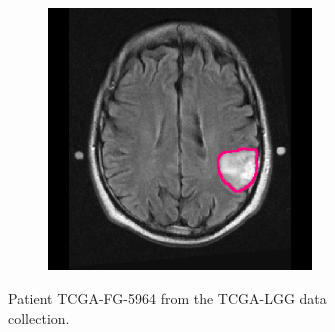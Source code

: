 \begin{subappendices}
\begin{figure}[htbp]
\begin{subfigure}[b]{0.95\textwidth}
\begin{subfigure}[b]{0.215\textwidth}
        \end{subfigure}
        \hfill
        \begin{subfigure}[b]{0.215\textwidth}
        \includegraphics[width=\textwidth, clip, trim=2.5cm 0.5cm 2.5cm 0.5cm]{Figures/Random_segs/FLAIR_TCGA-FG-5964.png}
        \end{subfigure}
        \caption{Patient TCGA-FG-5964 from the TCGA-LGG data collection.}
    \end{subfigure}
    \begin{subfigure}[b]{0.95\textwidth}
        \centering
        \hfill
        \begin{subfigure}[b]{0.215\textwidth}

\end{subfigure}
\end{subfigure}
\end{figure}
\end{subappendices}
